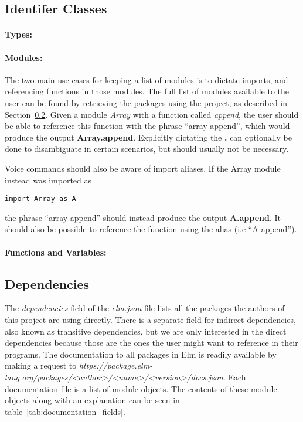 \documentclass[../thesis.tex]{subfiles}
\begin{document}
\subsection{Identifer Classes}%
\label{sub:identifer_classes}

\paragraph{Types:}%
\label{par:types}


\paragraph{Modules:}%
\label{par:modules}
The two main use cases for keeping a list of modules is to dictate imports, and referencing functions in those modules.
The full list of modules available to the user can be found by retrieving the packages using the project, as described in Section~\ref{sub:dependencies}.
Given a module \textit{Array} with a function called \textit{append}, the user should be able to
reference this function with the phrase ``array append'', which would produce the output \textbf{Array.append}.
Explicitly dictating the \textbf{.} can optionally be done to disambiguate in certain scenarios, but should usually not be necessary.

Voice commands should also be aware of import aliases.
If the Array module instead was imported as
\begin{verbatim}
import Array as A
\end{verbatim}
the phrase ``array append'' should instead produce the output \textbf{A.append}.
It should also be possible to reference the function using the alias (i.e ``A append'').





\paragraph{Functions and Variables:}%
\label{par:functions_and_variables}

\subsection{Dependencies}%
\label{sub:dependencies}
The \textit{dependencies} field of the \textit{elm.json} file lists all the packages the authors of this project
are using directly.
There is a separate field for indirect dependencies, also known as transitive dependencies, 
but we are only interested in the direct dependencies because those are the ones the user might want to
reference in their programs.
The documentation to all packages in Elm is readily available by making a request to
\textit{https://package.elm-lang.org/packages/<author>/<name>/<version>/docs.json}.
Each documentation file is a list of module objects.
The contents of these module objects along with an explanation can be seen in table~\ref{tab:documentation_fields}.
\end{document}
